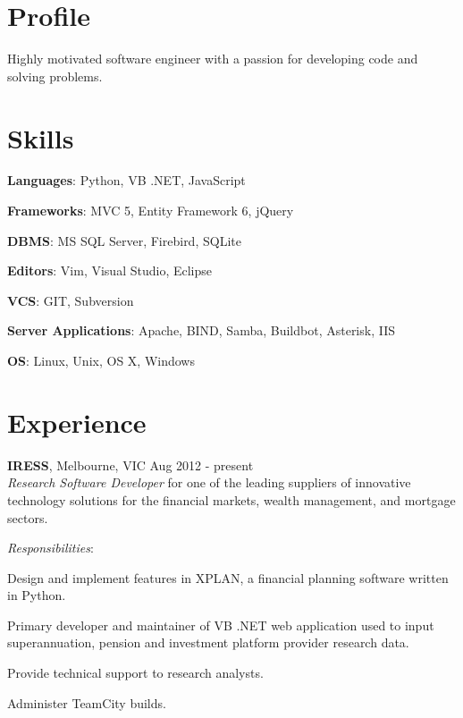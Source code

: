 \documentclass[line,margin]{res}
\begin{document}
    \address{ablack@fastmail.net}
    \address{0401 868 343}

    \begin{resume}
        \section{Profile}
        Highly motivated software engineer with a passion for developing code and solving problems.
            
        \section{Skills}
        \begin{list}{}{\leftmargin=1em \itemsep=-2pt}
            \item{\textbf{Languages}: Python, VB .NET, JavaScript}
            \item{\textbf{Frameworks}: MVC 5, Entity Framework 6, jQuery}
            \item{\textbf{DBMS}: MS SQL Server, Firebird, SQLite}
            \item{\textbf{Editors}: Vim, Visual Studio, Eclipse}
            \item{\textbf{VCS}: GIT, Subversion}
            \item{\textbf{Server Applications}: Apache, BIND, Samba, Buildbot, Asterisk, IIS}
            \item{\textbf{OS}: Linux, Unix, OS X, Windows}
        \end{list}

        \section{Experience}
        \textbf{IRESS}, Melbourne, VIC \hfill Aug 2012 - present \\
        \textit{Research Software Developer} for one of the leading suppliers of innovative technology
        solutions for the financial markets, wealth management, and mortgage sectors.

        \textit{Responsibilities}:
        \begin{list}{}{\leftmargin=1em \itemsep=-2pt}
            \item{Design and implement features in XPLAN, a financial planning software written in Python.}
            \item{Primary developer and maintainer of VB .NET web application used to input superannuation,
            pension and investment platform provider research data.}
            \item{Provide technical support to research analysts.}
            \item{Administer TeamCity builds.}
        \end{list}


\end{resume}
\end{document}
